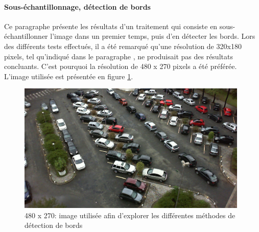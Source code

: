 \paragraph{Sous-échantillonnage, détection de bords}\label{conception.traitement.eval.down-edge}
Ce paragraphe présente les résultats d'un traitement qui consiste en sous-échantillonner l'image dans un premier temps, puis d'en détecter les bords. Lors des différents tests effectués, il a été remarqué qu'une résolution de 320x180 pixels, tel qu'indiqué dans le paragraphe , ne produisait pas des résultats concluants. C'est pourquoi la résolution de 480 x 270 pixels a été préférée. L'image utilisée est présentée en figure \ref{fig:image_process_down_edge_orig}.

\begin{figure}[H]
    \includegraphics[width=110mm]{img/conception/image_process/downsample_only/2.png}
    \centering
    \caption{480 x 270: image utilisée afin d'explorer les différentes méthodes de détection de bords}
    \label{fig:image_process_down_edge_orig}
\end{figure}

